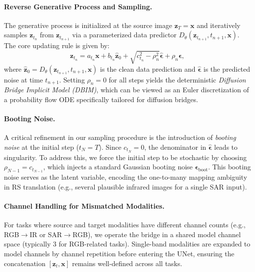 \paragraph{Reverse Generative Process and Sampling.}
The generative process is initialized at the source image $\bm{z}_T = \bm{x}$ and iteratively samples $\bm{z}_{t_n}$ from $\bm{z}_{t_{n+1}}$ via a parameterized data predictor $D_\theta(\bm{z}_{t_{n+1}}, t_{n+1}, \bm{x})$. The core updating rule is given by:
\begin{equation}
    \bm{z}_{t_n} = a_{t_n} \bm{x} + b_{t_n} \hat{\bm{z}}_0 + \sqrt{c_{t_n}^2 - \rho_n^2} \hat{\bm{\epsilon}} + \rho_n \bm{\epsilon},
    \label{eq:dbim_update}
\end{equation}
where $\hat{\bm{z}}_0 = D_\theta(\bm{z}_{t_{n+1}}, t_{n+1}, \bm{x})$ is the clean data prediction and $\hat{\bm{\epsilon}}$ is the predicted noise at time $t_{n+1}$. Setting $\rho_n = 0$ for all steps yields the deterministic \emph{Diffusion Bridge Implicit Model (DBIM)}, which can be viewed as an Euler discretization of a probability flow ODE specifically tailored for diffusion bridges.

\paragraph{Booting Noise.} A critical refinement in our sampling procedure is the introduction of \emph{booting noise} at the initial step ($t_N = T$). Since $c_{t_N} = 0$, the denominator in $\hat{\bm{\epsilon}}$ leads to singularity. To address this, we force the initial step to be stochastic by choosing $\rho_{N-1} = c_{t_{N-1}}$, which injects a standard Gaussian booting noise $\bm{\epsilon}_{\text{boot}}$. This booting noise serves as the latent variable, encoding the one-to-many mapping ambiguity in RS translation (e.g., several plausible infrared images for a single SAR input).

\paragraph{Channel Handling for Mismatched Modalities.}
For tasks where source and target modalities have different channel counts (e.g., RGB$\rightarrow$IR or SAR$\rightarrow$RGB), we operate the bridge in a shared model channel space (typically 3 for RGB-related tasks). Single-band modalities are expanded to model channels by channel repetition before entering the UNet, ensuring the concatenation $[\bm{z}_t, \bm{x}]$ remains well-defined across all tasks.

